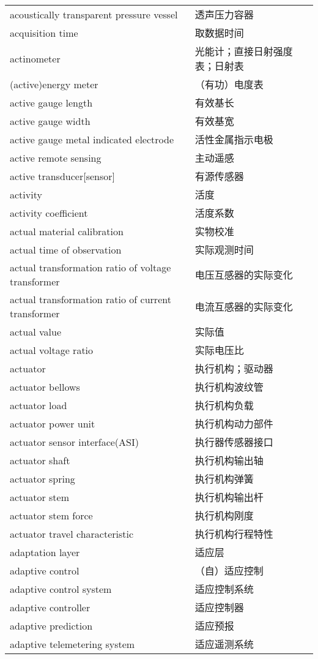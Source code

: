 \documentclass[
]{article}
\begin{document}
\begin{longtable}[]{@{}ll@{}}
acoustically transparent pressure vessel & 透声压力容器 \\
acquisition time & 取数据时间 \\
actinometer & 光能计；直接日射强度表；日射表 \\
(active)energy meter & （有功）电度表 \\
active gauge length & 有效基长 \\
active gauge width & 有效基宽 \\
active gauge metal indicated electrode & 活性金属指示电极 \\
active remote sensing & 主动遥感 \\
active transducer{[}sensor{]} & 有源传感器 \\
activity & 活度 \\
activity coefficient & 活度系数 \\
actual material calibration & 实物校准 \\
actual time of observation & 实际观测时间 \\
actual transformation ratio of voltage transformer &
电压互感器的实际变化 \\
actual transformation ratio of current transformer &
电流互感器的实际变化 \\
actual value & 实际值 \\
actual voltage ratio & 实际电压比 \\
actuator & 执行机构；驱动器 \\
actuator bellows & 执行机构波纹管 \\
actuator load & 执行机构负载 \\
actuator power unit & 执行机构动力部件 \\
actuator sensor interface(ASI) & 执行器传感器接口 \\
actuator shaft & 执行机构输出轴 \\
actuator spring & 执行机构弹簧 \\
actuator stem & 执行机构输出杆 \\
actuator stem force & 执行机构刚度 \\
actuator travel characteristic & 执行机构行程特性 \\
adaptation layer & 适应层 \\
adaptive control & （自）适应控制 \\
adaptive control system & 适应控制系统 \\
adaptive controller & 适应控制器 \\
adaptive prediction & 适应预报 \\
adaptive telemetering system & 适应遥测系统 \\

\end{longtable}
\end{document}

